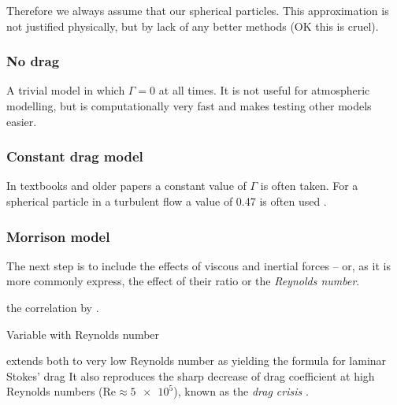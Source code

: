         Therefore we always assume that our spherical particles.
        This approximation is not justified physically, but by lack of any better methods (OK this is cruel).

        \subsubsection{No drag} \label{mdn}
            A trivial model in which $\Gamma = 0$ at all times.
            It is not useful for atmospheric modelling, but is computationally
            very fast and makes testing other models easier.

        \subsubsection{Constant drag model} \label{mdc}
            In textbooks and older papers a constant value of $\Gamma$ is often taken.
            For a spherical particle in a turbulent flow a value of \num{0.47}
            is often used \cite{???}. \cite{hrábek} \cite{havrila}

        \subsubsection{Morrison model} \label{mdM}
            The next step is to include the effects of viscous and inertial forces -- or,
            as it is more commonly express, the effect of their ratio or the \emph{Reynolds number}.

            the correlation by \citet{morrison2016}.

            Variable with Reynolds number

            extends both to very low Reynolds number as
            yielding the formula for laminar Stokes' drag
            It also reproduces the sharp decrease of drag coefficient at high Reynolds
            numbers ($\mathrm{Re} \approx \num{5e5}$), known as the \emph{drag crisis} \cite{???}.


